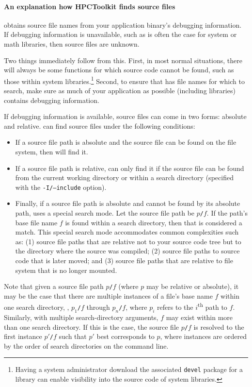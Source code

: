 \documentclass[11pt,twoside,letterpaper]{report}
\begin{document}
\paragraph{An explanation how HPCToolkit finds source files}

\hpcprofAll{} obtains source file names from your application binary's debugging information.
If debugging information is unavailable, such as is often the case for system or math libraries, then source files are unknown.


Two things immediately follow from this.
First, in most normal situations, there will always be some functions for which source code cannot be found, such as those within system libraries.\footnote{Having a system administrator download the associated {\tt devel} package for a library can enable visibility into the source code of system libraries.}
Second, to ensure that \hpcprofAll{} has file names for which to search, make sure as much of your application as possible (including libraries) contains debugging information.

If debugging information is available, source files can come in two forms: absolute and relative.
\hpcprofAll{} can find source files under the following conditions:
\begin{itemize}
\item If a source file path is absolute and the source file can be found on the file system, then \hpcprofAll{} will find it.
\item If a source file path is relative, \hpcprofAll{} can only find it if the source file can be found from the current working directory or within a search directory (specified with the \texttt{-I/--include} option).
\item Finally, if a source file path is absolute and cannot be found by its absolute path, \hpcprofAll{} uses a special search mode.
Let the source file path be \texttt{$p$/$f$}.
If the path's base file name $f$ is found within a search directory, then that is considered a match.
This special search mode accommodates common complexities such as:
(1) source file paths that are relative not to your source code tree but to the directory where the source was compiled;
(2) source file paths to source code that is later moved; and
(3) source file paths that are relative to file system that is no longer mounted.
\end{itemize}
Note that given a source file path \texttt{$p$/$f$} (where $p$ may be relative or absolute), it may be the case that there are multiple instances of a file's base name $f$ within one search directory, \eg{}, \texttt{$p_1$/$f$} through \texttt{$p_n$/$f$}, where $p_i$ refers to the $i$\textsuperscript{th} path to $f$.
Similarly, with multiple search-directory arguments, $f$ may exist within more than one search directory.
If this is the case, the source file \texttt{$p$/$f$} is resolved to the first instance \texttt{$p'$/$f$} such that $p'$ best corresponds to $p$, where instances are ordered by the order of search directories on the command line.
\end{document}
